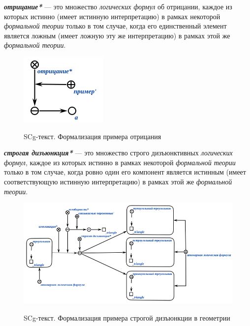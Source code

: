 \begin{SCn}
\end{SCn}

\textbf{\textit{отрицание*}} --- это множество \textit{логических формул} об отрицании, каждое из которых истинно (имеет истинную интерпретацию) в рамках некоторой \textit{формальной теории} только в том случае, когда его единственный элемент является ложным (имеет ложную эту же интерпретацию) в рамках этой же \textit{формальной теории}.

\begin{figure}[H]
	\caption{SCg-текст. Формализация примера отрицания}
	\includegraphics[scale=0.8]{author/part2/figures/logic/negation.png}
	\label{fig:negation}
\end{figure}

\begin{SCn}
\end{SCn}

\textbf{\textit{строгая дизъюнкция*}} --- это множество строго дизъюнктивных \textit{логических формул}, каждое из которых истинно в рамках некоторой \textit{формальной теории} только в том случае, когда ровно один его компонент является истинным (имеет соответствующую истинную интерпретацию) в рамках этой же \textit{формальной теории}.

\begin{figure}[H]
	\caption{SCg-текст. Формализация примера строгой дизъюнкции в геометрии}
	\includegraphics[scale=0.8]{author/part2/figures/logic/strict_disjunction_triangle.png}
	\label{fig:strict_disjunction_triangle}
\end{figure}

